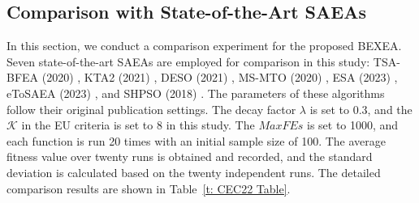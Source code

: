 \documentclass[review]{elsarticle}
\begin{document}
\subsection{Comparison with State-of-the-Art SAEAs}
In this section, we conduct a comparison experiment for the proposed BEXEA. Seven state-of-the-art SAEAs are employed for comparison in this study: TSA-BFEA (2020) \cite{wang2020transfer}, KTA2 (2021) \cite{song2021kriging}, DESO (2021) \cite{huixiang2021data}, MS-MTO (2020) \cite{liao2020multi}, ESA (2023) \cite{zhen2022evolutionary}, eToSAEA (2023) \cite{wei2023efficient}, and SHPSO (2018) \cite{yu2018surrogate}. The parameters of these algorithms follow their original publication settings. The decay factor $\lambda$ is set to 0.3, and the $\mathcal{K}$ in the EU criteria is set to 8 in this study. The $MaxFEs$ is set to 1000, and each function is run 20 times with an initial sample size of 100. The average fitness value over twenty runs is obtained and recorded, and the standard deviation is calculated based on the twenty independent runs. The detailed comparison results are shown in Table~\ref{t: CEC22 Table}.
\end{document}
